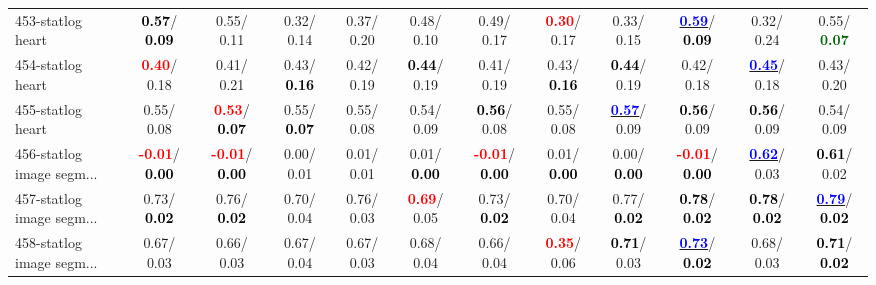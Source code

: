 \begin{table}[h]
\begin{center}
{\begin{tabular}{lc|c|c|c|c|c|c|c|c|c|c}
453-statlog heart & \textcolor{black}{\textbf{  0.57}}/\textcolor{black}{\textbf{  0.09}} &   0.55/  0.11 &   0.32/  0.14 &   0.37/  0.20 &   0.48/  0.10 &   0.49/  0.17 & \textcolor{red}{\textbf{  0.30}}/  0.17 &   0.33/  0.15 & \underline{\textcolor{blue}{\textbf{  0.59}}}/\textcolor{black}{\textbf{  0.09}} &   0.32/  0.24 &   0.55/\textcolor{darkgreen}{\textbf{  0.07}} \\
454-statlog heart & \textcolor{red}{\textbf{  0.40}}/  0.18 &   0.41/  0.21 &   0.43/\textcolor{black}{\textbf{  0.16}} &   0.42/  0.19 & \textcolor{black}{\textbf{  0.44}}/  0.19 &   0.41/  0.19 &   0.43/\textcolor{black}{\textbf{  0.16}} & \textcolor{black}{\textbf{  0.44}}/  0.19 &   0.42/  0.18 & \underline{\textcolor{blue}{\textbf{  0.45}}}/  0.18 &   0.43/  0.20 \\
455-statlog heart &   0.55/  0.08 & \textcolor{red}{\textbf{  0.53}}/\textcolor{black}{\textbf{  0.07}} &   0.55/\textcolor{black}{\textbf{  0.07}} &   0.55/  0.08 &   0.54/  0.09 & \textcolor{black}{\textbf{  0.56}}/  0.08 &   0.55/  0.08 & \underline{\textcolor{blue}{\textbf{  0.57}}}/  0.09 & \textcolor{black}{\textbf{  0.56}}/  0.09 & \textcolor{black}{\textbf{  0.56}}/  0.09 &   0.54/  0.09 \\ \hline
456-statlog image segm... & \textcolor{red}{\textbf{ -0.01}}/\textcolor{black}{\textbf{  0.00}} & \textcolor{red}{\textbf{ -0.01}}/\textcolor{black}{\textbf{  0.00}} &   0.00/  0.01 &   0.01/  0.01 &   0.01/\textcolor{black}{\textbf{  0.00}} & \textcolor{red}{\textbf{ -0.01}}/\textcolor{black}{\textbf{  0.00}} &   0.01/\textcolor{black}{\textbf{  0.00}} &   0.00/\textcolor{black}{\textbf{  0.00}} & \textcolor{red}{\textbf{ -0.01}}/\textcolor{black}{\textbf{  0.00}} & \underline{\textcolor{blue}{\textbf{  0.62}}}/  0.03 & \textcolor{black}{\textbf{  0.61}}/  0.02 \\
457-statlog image segm... &   0.73/\textcolor{black}{\textbf{  0.02}} &   0.76/\textcolor{black}{\textbf{  0.02}} &   0.70/  0.04 &   0.76/  0.03 & \textcolor{red}{\textbf{  0.69}}/  0.05 &   0.73/\textcolor{black}{\textbf{  0.02}} &   0.70/  0.04 &   0.77/\textcolor{black}{\textbf{  0.02}} & \textcolor{black}{\textbf{  0.78}}/\textcolor{black}{\textbf{  0.02}} & \textcolor{black}{\textbf{  0.78}}/\textcolor{black}{\textbf{  0.02}} & \underline{\textcolor{blue}{\textbf{  0.79}}}/\textcolor{black}{\textbf{  0.02}} \\
458-statlog image segm... &   0.67/  0.03 &   0.66/  0.03 &   0.67/  0.04 &   0.67/  0.03 &   0.68/  0.04 &   0.66/  0.04 & \textcolor{red}{\textbf{  0.35}}/  0.06 & \textcolor{black}{\textbf{  0.71}}/  0.03 & \underline{\textcolor{blue}{\textbf{  0.73}}}/\textcolor{black}{\textbf{  0.02}} &   0.68/  0.03 & \textcolor{black}{\textbf{  0.71}}/\textcolor{black}{\textbf{  0.02}} \\

\end{tabular}}
\end{center}
\end{table}
